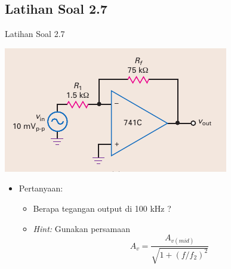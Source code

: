 \subsection{Latihan Soal 2.7}
\begin{frame}{Latihan Soal 2.7}
	\begin{multicols}{2}
		\begin{center}
			\includegraphics[width=\linewidth]{gambar/fig-16.16a}
		\end{center}
		\columnbreak
		\begin{itemize}
			\item Pertanyaan:
			\begin{itemize}
				\item Berapa tegangan output di 100 kHz ?
				\item \textit{Hint:} Gunakan persamaan \[ A_v = \frac{A_{v(mid)}}{ \sqrt{1 + (f/f_2)^2} } \]
			\end{itemize}
		\end{itemize}
	\end{multicols}
\end{frame}

